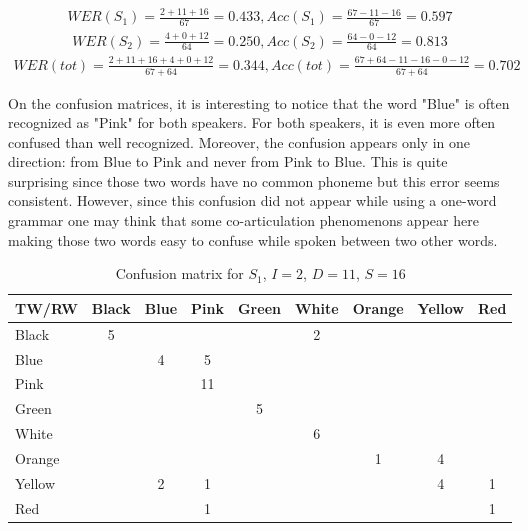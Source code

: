 \begin{align*}
WER(S_1) = \frac{2 + 11 +16}{67} = 0.433, Acc(S_1) = \frac{67-11-16}{67} = 0.597
\end{align*}
\begin{align*}
WER(S_2) = \frac{4 + 0 + 12}{64} = 0.250, Acc(S_2) = \frac{64-0-12}{64} = 0.813 
\end{align*}
\begin{align*}
WER(tot) = \frac{2 + 11 +16 +4 +0 +12}{67+64} = 0.344, Acc(tot) = \frac{67 + 64 -11-16 - 0 -12}{67 + 64} = 0.702 
\end{align*}

On the confusion matrices, it is interesting to notice that the word "Blue" is often recognized as "Pink" for both speakers. For both speakers, it is even more often confused than well recognized. Moreover, the confusion appears only in one direction: from Blue to Pink and never from Pink to Blue. This is quite surprising since those two words have no common phoneme but this error seems consistent. However, since this confusion did not appear while using a one-word grammar one may think that some co-articulation phenomenons appear here making those two words easy to confuse while spoken between two other words. 

\begin{table}[h!]
  \begin{tabular}{|l|*{8}{c|}}
\hline
 TW/RW  & Black & Blue & Pink & Green & White & Orange & Yellow & Red \\
\hline
Black &	5 & & & & 2 & & &  \\
\hline	
Blue  &	& 4 & 5 & & & & & \\
\hline
Pink  & & & 11 & & & & & \\
\hline					
Green & & & & 5 & & & & \\
\hline
White & & & & & 6 & & & \\
\hline
Orange & & & & & & 1 & 4 & 	\\
\hline
Yellow & & 2 & 1 & & & & 4 & 1 	\\
\hline
Red & & & 1 & & & & & 1 \\
\hline
  \end{tabular}
\caption{Confusion matrix for $S_1$, $I = 2$, $D = 11$, $S=16$}
\label{tad:david_result}
\end{table}

